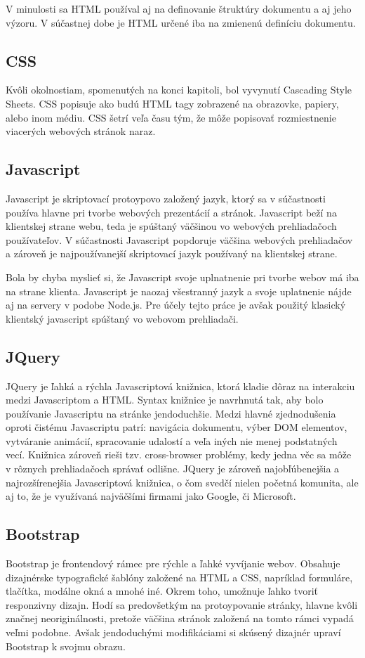 V minulosti sa HTML používal aj na definovanie štruktúry dokumentu a aj jeho výzoru. V súčastnej dobe je HTML určené iba na zmienenú definíciu dokumentu.

\subsection{CSS}
\label{sec:css}
Kvôli okolnostiam, spomenutých na konci kapitoli, bol vyvynutí Cascading Style Sheets. CSS popisuje ako budú HTML tagy zobrazené na obrazovke, papiery, alebo inom médiu. CSS šetrí veľa času tým, že môže popisovať rozmiestnenie viacerých webových stránok naraz.

\subsection{Javascript}
\label{sec:javascript}
Javascript je skriptovací protoypovo založený jazyk, ktorý sa v súčastnosti používa hlavne pri tvorbe webových prezentácií a stránok. Javascript beží na klientskej strane webu, teda je spúštaný väčšinou vo webových prehliadačoch používateľov. V súčastnosti Javascript popdoruje väčšina webových prehliadačov a zároveň je najpoužívanejší skriptovací jazyk používaný na klientskej strane.

Bola by chyba myslieť si, že Javascript svoje uplnatnenie pri tvorbe webov má iba na strane klienta. Javascript je naozaj všestranný jazyk a svoje uplatnenie nájde aj na servery v podobe Node.js. Pre účely tejto práce je avšak použitý klasický klientský javascript spúštaný vo webovom prehliadači.


\subsection{JQuery}
\label{sec:jquery}
JQuery je ľahká a rýchla Javascriptová knižnica, ktorá kladie dôraz na interakciu medzi Javascriptom a HTML. Syntax knižnice je navrhnutá tak, aby bolo používanie Javascriptu na stránke jendoduchšie. Medzi hlavné zjednodušenia oproti čistému Javascriptu patrí: navigácia dokumentu, výber DOM elementov, vytváranie animácií, spracovanie udalostí a veľa iných nie menej podstatných vecí. Knižnica zároveň rieši tzv. cross-browser problémy, kedy jedna věc sa môže v rôznych prehliadačoch správať odlišne.
JQuery je zároveň najobľúbenejšia a najrozšírenejšia Javascriptová knižnica, o čom svedčí nielen početná komunita, ale aj to, že je využívaná najväčšími firmami jako Google, či Microsoft.


\subsection{Bootstrap}
\label{sec:bootstrap}
Bootstrap je frontendový rámec pre rýchle a ľahké vyvíjanie webov. Obsahuje dizajnérske typografické šablóny založené na HTML a CSS, napríklad formuláre, tlačítka, modálne okná a mnohé iné. Okrem toho, umožnuje ľahko tvoriť responzivny dizajn. Hodí sa predovšetkým na protoypovanie stránky, hlavne kvôli značnej neoriginálnosti, pretože väčšina stránok založená na tomto rámci vypadá veľmi podobne. Avšak jendoduchými   modifikáciami si skúsený dizajnér upraví Bootstrap k svojmu obrazu.  

